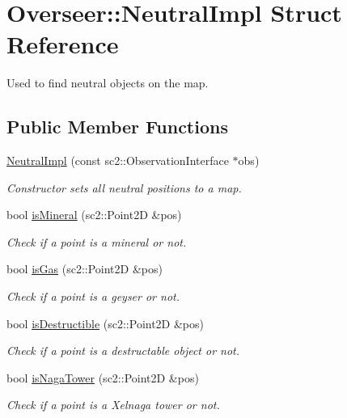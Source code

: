 \hypertarget{structOverseer_1_1NeutralImpl}{}\section{Overseer\+:\+:Neutral\+Impl Struct Reference}
\label{structOverseer_1_1NeutralImpl}


Used to find neutral objects on the map.  


\subsection*{Public Member Functions}
\begin{DoxyCompactItemize}
\item 
\hyperlink{structOverseer_1_1NeutralImpl_a2ef6e7f65f2c6de6bc6beda0f020ba62}{Neutral\+Impl} (const sc2\+::\+Observation\+Interface $\ast$obs)
\begin{DoxyCompactList}\small\item\em Constructor sets all neutral positions to a map. \end{DoxyCompactList}\item 
bool \hyperlink{structOverseer_1_1NeutralImpl_a6bb0b123b5db8ab4285715d71a4d7e5b}{is\+Mineral} (sc2\+::\+Point2D \&pos)
\begin{DoxyCompactList}\small\item\em Check if a point is a mineral or not. \end{DoxyCompactList}\item 
bool \hyperlink{structOverseer_1_1NeutralImpl_a803959fe80b2b6bb14444a639b89acd5}{is\+Gas} (sc2\+::\+Point2D \&pos)
\begin{DoxyCompactList}\small\item\em Check if a point is a geyser or not. \end{DoxyCompactList}\item 
bool \hyperlink{structOverseer_1_1NeutralImpl_af8393ea00dad811b9132403e73d68f83}{is\+Destructible} (sc2\+::\+Point2D \&pos)
\begin{DoxyCompactList}\small\item\em Check if a point is a destructable object or not. \end{DoxyCompactList}\item 
bool \hyperlink{structOverseer_1_1NeutralImpl_a8e874807b118a287811311a033c98dc2}{is\+Naga\+Tower} (sc2\+::\+Point2D \&pos)
\begin{DoxyCompactList}\small\item\em Check if a point is a Xelnaga tower or not. \end{DoxyCompactList}\end{DoxyCompactItemize}


